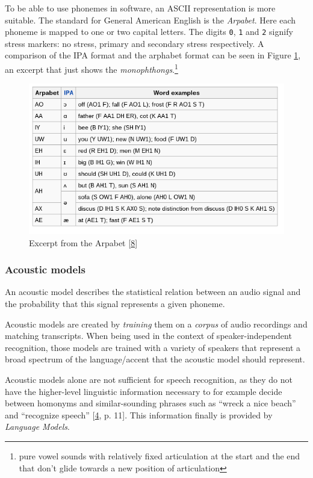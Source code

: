 \documentclass[]{article}
\begin{document}
To be able to use phonemes in software, an ASCII representation is more
suitable. The standard for General American English is the
\emph{Arpabet}. Here each phoneme is mapped to one or two capital
letters. The digits \texttt{0}, \texttt{1} and \texttt{2} signify stress
markers: no stress, primary and secondary stress respectively. A
comparison of the IPA format and the arphabet format can be seen in
Figure \ref{arpabet}, an excerpt that just shows the
\emph{monophthongs}.\footnote{pure vowel sounds with relatively fixed
  articulation at the start and the end that don't glide towards a new
  position of articulation}

\begin{figure}[htbp]
\centering
\includegraphics{images/arpabet.png}
\caption{Excerpt from the Arpabet {[}\hyperref[ref-wikiArpabet]{8}{]}
\label{arpabet}}
\end{figure}

\subsubsection{Acoustic models}\label{acoustic-models}

An acoustic model describes the statistical relation between an audio
signal and the probability that this signal represents a given phoneme.

Acoustic models are created by \emph{training} them on a \emph{corpus}
of audio recordings and matching transcripts. When being used in the
context of speaker-independent recognition, those models are trained
with a variety of speakers that represent a broad spectrum of the
language/accent that the acoustic model should represent.

Acoustic models alone are not sufficient for speech recognition, as they
do not have the higher-level linguistic information necessary to for
example decide between homonyms and similar-sounding phrases such as
``wreck a nice beach'' and ``recognize speech''
{[}\hyperref[ref-marquard]{4}, p. 11{]}. This information finally is
provided by \emph{Language Models}.
\end{document}
